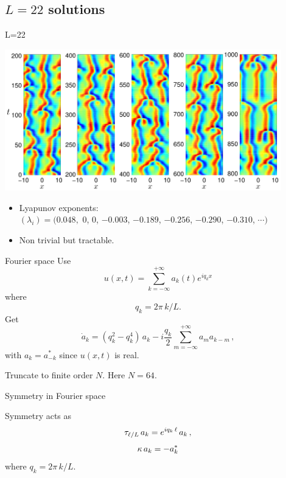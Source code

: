 \documentclass{beamer}
\begin{document}
\subsection{$L=22$ solutions}

\begin{frame}{L=22}
\begin{center}
  \includegraphics[width=0.9\textwidth,clip=true]{../../figs/ks_L22_long_orbit}
\end{center}

\begin{block}{} 
 \begin{itemize}
  \item Lyapunov exponents: \\
	$(\lambda_i) = (0.048,$ 0, 0, $-0.003$, $-0.189$, $-0.256$, $-0.290$, $-0.310$, $\cdots)$
  \item Non trivial but tractable.	
 \end{itemize}

\end{block}
 
\end{frame}

\begin{frame}{Fourier space}
Use
\[
  u(x,t)=\sum_{k=-\infty}^{+\infty} a_k (t) e^{ i q_k x }
\]
where
\[
 q_k = 2\pi\,k/L.
\]
Get
\[
 \dot{a}_k
     = ( q_k^2 - q_k^4 )\, a_k
    - i \frac{q_k}{2} \sum_{m=-\infty}^{+\infty} a_m a_{k-m}\,,
\]
with $a_{k}=a^\ast_{-k}$ since $u(x,t)$ is real.

Truncate to finite order $N$. Here $N=64$.
\end{frame}

\begin{frame}{Symmetry in Fourier space}

Symmetry acts as
\[
  \tau_{\ell/L}\, a_k = e^{i q_k\, \ell} \, a_k \,,
  \label{eq:shiftF}
\]
\[
   \kappa \, a_k = -a_k^\ast
\]
where $q_k = 2\pi\,k/L$.

\end{frame}
\end{document}
